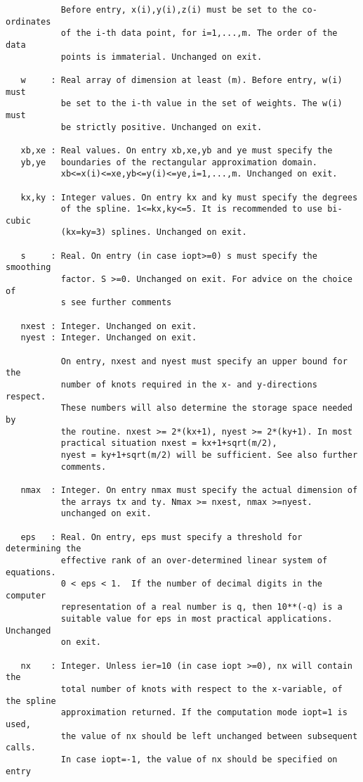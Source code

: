 \begin{verbatim}
           Before entry, x(i),y(i),z(i) must be set to the co-ordinates
           of the i-th data point, for i=1,...,m. The order of the data
           points is immaterial. Unchanged on exit.

   w     : Real array of dimension at least (m). Before entry, w(i) must
           be set to the i-th value in the set of weights. The w(i) must
           be strictly positive. Unchanged on exit.

   xb,xe : Real values. On entry xb,xe,yb and ye must specify the 
   yb,ye   boundaries of the rectangular approximation domain.
           xb<=x(i)<=xe,yb<=y(i)<=ye,i=1,...,m. Unchanged on exit.

   kx,ky : Integer values. On entry kx and ky must specify the degrees
           of the spline. 1<=kx,ky<=5. It is recommended to use bi-cubic
           (kx=ky=3) splines. Unchanged on exit.

   s     : Real. On entry (in case iopt>=0) s must specify the smoothing
           factor. S >=0. Unchanged on exit. For advice on the choice of 
           s see further comments

   nxest : Integer. Unchanged on exit.
   nyest : Integer. Unchanged on exit.

           On entry, nxest and nyest must specify an upper bound for the
           number of knots required in the x- and y-directions respect.
           These numbers will also determine the storage space needed by
           the routine. nxest >= 2*(kx+1), nyest >= 2*(ky+1). In most 
           practical situation nxest = kx+1+sqrt(m/2), 
           nyest = ky+1+sqrt(m/2) will be sufficient. See also further 
           comments.

   nmax  : Integer. On entry nmax must specify the actual dimension of
           the arrays tx and ty. Nmax >= nxest, nmax >=nyest.
           unchanged on exit.

   eps   : Real. On entry, eps must specify a threshold for determining the
           effective rank of an over-determined linear system of equations. 
           0 < eps < 1.  If the number of decimal digits in the computer 
           representation of a real number is q, then 10**(-q) is a 
           suitable value for eps in most practical applications. Unchanged 
           on exit.

   nx    : Integer. Unless ier=10 (in case iopt >=0), nx will contain the 
           total number of knots with respect to the x-variable, of the spline
           approximation returned. If the computation mode iopt=1 is used, 
           the value of nx should be left unchanged between subsequent calls.
           In case iopt=-1, the value of nx should be specified on entry


\end{verbatim}
